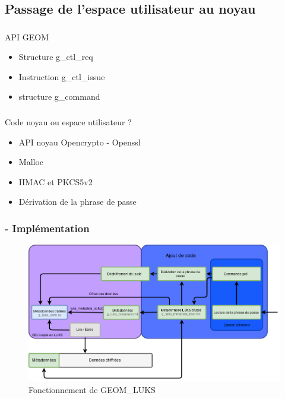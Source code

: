 \subsection{Passage de l'espace utilisateur au noyau}

\begin{frame}
	\frametitle{\insertsubsectionhead}
	\begin{block}{API GEOM}
		\begin{itemize}
			\item Structure g\_ctl\_req
			\item Instruction g\_ctl\_issue
			\item structure g\_command
		\end{itemize}
	\end{block}
\end{frame}

\begin{frame}
	\frametitle{\insertsubsectionhead}
	\begin{block}{Code noyau ou espace utilisateur ?}
		\begin{itemize}
			\item API noyau Opencrypto - Openssl
			\item Malloc
			\item HMAC et PKCS5v2
			\item Dérivation de la phrase de passe
		\end{itemize}
	\end{block}
\end{frame}

\begin{frame}
	\frametitle{\insertsubsectionhead - Implémentation}
	\begin{figure}
		\includegraphics[width=\textwidth]{developpement/utilisation_metadonnee_luks_2}
		\caption{Fonctionnement de GEOM\_LUKS}
	\end{figure}
\end{frame}
